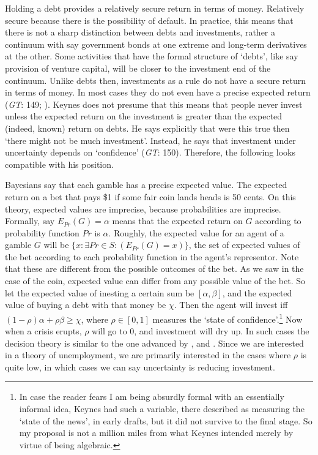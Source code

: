 Holding a debt provides a relatively secure return in terms of money. Relatively secure because there is the possibility of default. In practice, this means that there is not a sharp distinction between debts and investments, rather a continuum with say government bonds at one extreme and long-term derivatives at the other. Some activities that have the formal structure of `debts', like say provision of venture capital, will be closer to the investment end of the continuum. Unlike debts then, investments as a rule do not have a secure return in terms of money. In most cases they do not even have a precise expected return (\textit{GT}: 149; \citet[113]{Keynes1937}). Keynes does not presume that this means that people never invest unless the expected return on the investment is greater than the expected (indeed, known) return on debts. He says explicitly that were this true then `there might not be much investment'. Instead, he says that investment under uncertainty depends on `confidence' (\textit{GT}: 150). Therefore, the following looks compatible with his position. 

Bayesians say that each gamble has a precise expected value. The expected return on a bet that pays \$1 if some fair coin lands heads is 50 cents. On this theory, expected values are imprecise, because probabilities are imprecise. Formally, say \(E_{Pr}(G) = \alpha\) means that the expected return on \(G\) according to probability function \(Pr\) is \(\alpha\). Roughly, the expected value for an agent of a gamble \(G\) will be \(\{x: \exists Pr \in S: (E_{Pr}(G) = x)\}\), the set of  expected values of the bet according to each probability function in the agent's representor. Note that these are different from the possible outcomes of the bet. As we saw in the case of the coin, expected value can differ from any possible value of the bet. So let the expected value of inesting a certain sum be \([\alpha, \beta]\), and the expected value of buying a debt with that money be \(\chi\). Then the agent will invest iff \((1 - \rho)\alpha + \rho \beta \geq \chi\), where \(\rho \in [0, 1]\) measures the `state of confidence'.\footnote{In case the reader fears I am being absurdly formal with an essentially informal idea, Keynes had such a variable, there described as measuring the `state of the news', in early drafts, but it did not survive to the final stage. So my proposal is not a million miles from what Keynes intended merely by virtue of being algebraic.} Now when a crisis erupts, \(\rho\) will go to 0, and investment will dry up. In such cases the decision theory is similar to the one advanced by \citet{Levi1980}, \citet{Strat1990} and \citet{Jaffray1994}. Since we are interested in a theory of unemployment, we are primarily interested in the cases where \(\rho\) is quite low, in which cases we can say uncertainty is reducing investment.

